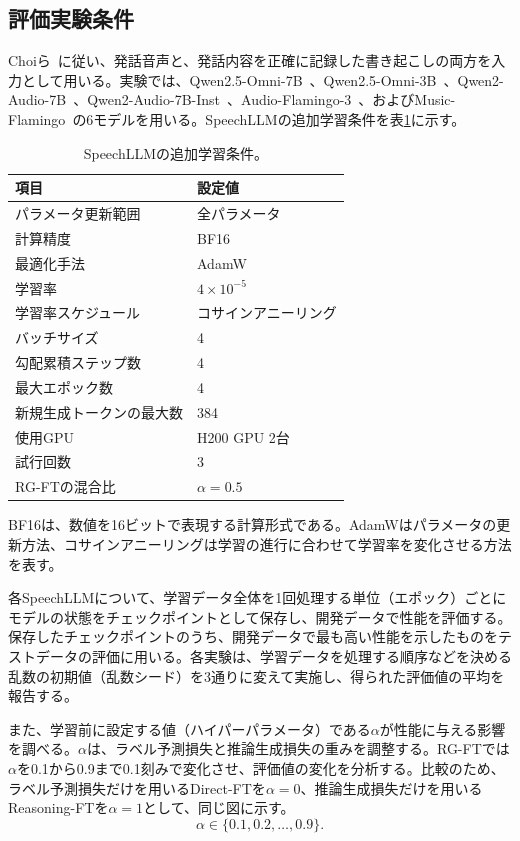\documentclass[11pt,a4paper]{ltjsarticle}
\begin{document}
\subsection{評価実験条件}
Choiら~\cite{choi2025exploring}に従い、発話音声と、発話内容を正確に記録した書き起こしの両方を入力として用いる。実験では、Qwen2.5-Omni-7B~\cite{xu2025qwen25omni}、Qwen2.5-Omni-3B~\cite{xu2025qwen25omni}、Qwen2-Audio-7B~\cite{chu2024qwen2}、Qwen2-Audio-7B-Inst~\cite{chu2024qwen2}、Audio-Flamingo-3~\cite{goel2025audioflamingo3}、およびMusic-Flamingo~\cite{ghosh2025musicflamingoscalingmusic}の6モデルを用いる。SpeechLLMの追加学習条件を表\ref{tab:settings}に示す。

\begin{table}[htbp]
\centering
\caption{SpeechLLMの追加学習条件。}
\label{tab:settings}
\begin{tabular}{ll}
\hline
項目 & 設定値 \\ \hline
パラメータ更新範囲 & 全パラメータ \\
計算精度 & BF16 \\
最適化手法 & AdamW \\
学習率 & $4\times10^{-5}$ \\
学習率スケジュール & コサインアニーリング \\
バッチサイズ & 4 \\
勾配累積ステップ数 & 4 \\
最大エポック数 & 4 \\
新規生成トークンの最大数 & 384 \\
使用GPU & H200 GPU 2台 \\
試行回数 & 3 \\
RG-FTの混合比 & $\alpha=0.5$ \\ \hline
\end{tabular}
\end{table}

BF16は、数値を16ビットで表現する計算形式である。AdamWはパラメータの更新方法、コサインアニーリングは学習の進行に合わせて学習率を変化させる方法を表す。

各SpeechLLMについて、学習データ全体を1回処理する単位（エポック）ごとにモデルの状態をチェックポイントとして保存し、開発データで性能を評価する。保存したチェックポイントのうち、開発データで最も高い性能を示したものをテストデータの評価に用いる。各実験は、学習データを処理する順序などを決める乱数の初期値（乱数シード）を3通りに変えて実施し、得られた評価値の平均を報告する。

また、学習前に設定する値（ハイパーパラメータ）である$\alpha$が性能に与える影響を調べる。$\alpha$は、ラベル予測損失と推論生成損失の重みを調整する。RG-FTでは$\alpha$を0.1から0.9まで0.1刻みで変化させ、評価値の変化を分析する。比較のため、ラベル予測損失だけを用いるDirect-FTを$\alpha=0$、推論生成損失だけを用いるReasoning-FTを$\alpha=1$として、同じ図に示す。
\begin{equation}
\alpha\in\{0.1,0.2,\ldots,0.9\}.
\tag{12}
\end{equation}
\end{document}
